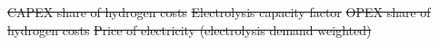 \documentclass[5p,numafflabel]{elsarticle}
\def\runsensnogreenhy{decr_14_3H_ws}
\providecommand{\DIFdeltex}[1]{{\protect\color{red}\sout{#1}}}                      %
\providecommand{\DIFdelFL}[1]{\DIFdel{#1}} %
\providecommand{\DIFdel}[1]{\texorpdfstring{\DIFdeltex{#1}}{}} %
\begin{document}
{%
\DIFdelFL{CAPEX share of hydrogen costs}}
{%
\DIFdelFL{Electrolysis capacity factor}}
{%
\DIFdelFL{OPEX share of hydrogen costs}}
{%
\DIFdelFL{Price of electricity (electrolysis demand weighted)}}
\end{document}
